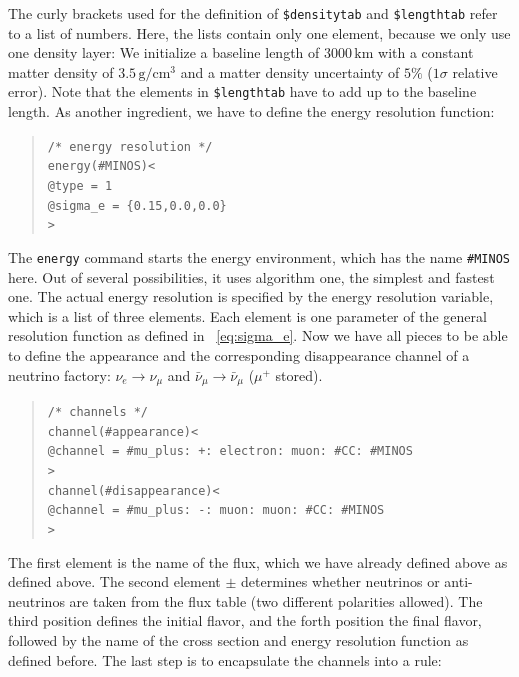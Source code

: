 The curly brackets used for the definition of {\tt \$densitytab} and
{\tt \$lengthtab} refer to a list of numbers. Here, the lists contain only
one element, because we only use one density layer: We initialize a baseline length of $3000 \, \mathrm{km}$ with a constant matter density of $3.5 \, \mathrm{g/cm^3}$ and a matter density uncertainty of $5\%$ ($1 \sigma$ relative error). Note that the elements in {\tt \$lengthtab} have to add up to the baseline length. 
%
As another ingredient, we have to define the energy resolution function:
\begin{quote}
{\tt /* energy resolution */}\\
{\tt energy(\#MINOS)<}\\
{\tt \tb @type = 1}\\
{\tt \tb @sigma\_e = \{0.15,0.0,0.0\}}\\
{\tt >}
\end{quote}
The {\tt energy} command starts the energy environment, which has the name 
{\tt \#MINOS} here. Out of several possibilities, it uses algorithm one,
the simplest and fastest one. The actual energy resolution is specified
by the energy resolution variable, which is a list of three elements. Each 
element is one parameter of the general resolution function as defined in 
\eq~\ref{eq:sigma_e}.
%
Now we have all pieces to be able to define the appearance and the corresponding disappearance channel of a neutrino factory: 
$\nu_e\rightarrow\nu_\mu$  and $\bar\nu_\mu\rightarrow\bar\nu_\mu$ 
($\mu^+$ stored).
\begin{quote}
{\tt /* channels */}\\
{\tt channel(\#appearance)<}\\
{\tt \tb @channel = \#mu\_plus: +: electron: muon: \#CC: \#MINOS}\\
{\tt >}\\
{\tt channel(\#disappearance)<}\\
{\tt \tb @channel = \#mu\_plus: -: muon: muon: \#CC: \#MINOS}\\
{\tt >}
\end{quote}
The first element is the name of the flux, which we have already defined above as defined above. The second element $\pm$ determines whether 
neutrinos or anti-neutrinos are taken from the flux table (two different polarities allowed). The third position defines the initial flavor,
and the forth position the final flavor, followed by the name of the cross
section and energy resolution function as defined before.
%
The last step is to encapsulate the channels into a rule:
